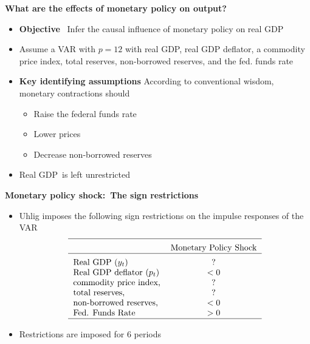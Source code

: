 \begin{frame}
{\textbf{What are the effects of monetary policy on output?}}\medskip

\begin{itemize}
\item \textbf{Objective} \ Infer the causal influence of monetary policy on
real GDP\bigskip \pause

\item Assume a VAR with $p=12$ with real GDP, real GDP deflator, a commodity
price index, total reserves, non-borrowed reserves, and the fed. funds
rate\bigskip

\item \textbf{Key identifying assumptions} According to conventional wisdom,
monetary contractions should\smallskip

\begin{itemize}
\item Raise the federal funds rate\smallskip

\item Lower prices\smallskip

\item Decrease non-borrowed reserves\bigskip
\end{itemize}

\item Real GDP\ is left unrestricted
\end{itemize}
\end{frame}


\begin{frame}
{\textbf{Monetary policy shock:\ The sign restrictions}}\bigskip

\begin{itemize}
\item Uhlig imposes the following sign restrictions on the impulse responses
of the VAR%
\begin{equation*}
\begin{tabular}{lc}
\hline
\addlinespace & Monetary Policy Shock \\ \hline
\addlinespace Real GDP ($y_{t}$) & ? \\ 
Real GDP\ deflator ($p_{t}$) & $<0$ \\ 
commodity price index, & ? \\ 
total reserves, & ? \\ 
non-borrowed reserves, & $<0$ \\ 
Fed. Funds Rate & $>0$ \\ \hline
\end{tabular}%
\end{equation*}%
\bigskip

\item Restrictions are imposed for $6$ periods
\end{itemize}
\end{frame}

